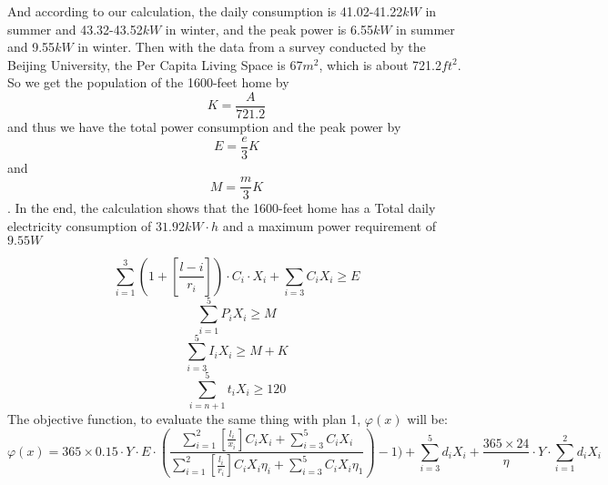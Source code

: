 \documentclass[12pt]{article}
\begin{document}
And according to our calculation, the daily consumption is 41.02-41.22$kW$ in summer and 43.32-43.52$kW$ in winter, and the peak power is 6.55$kW$ in summer and 9.55$kW$ in winter.
\newline
\newline
Then with the data from a survey conducted by the Beijing University, the Per Capita Living Space is 67$m^2$, which is about 721.2$ft^2$. So we get the population of the 1600-feet home
by $$K=\frac{A}{721.2}$$ and thus we have the total power consumption and the peak power by $$E=\frac{e}{3}K$$ and $$M=\frac{m}{3}K$$. In the end, the calculation shows that the 1600-feet home has a Total daily electricity consumption
of $31.92kW\cdot h$ and a maximum power requirement of $9.55W$


$$\sum_{i=1}^3(1+[\frac{l-i}{r_i}]) \cdot C_i \cdot X_i + \sum_{i=3}C_iX_i\geq E$$
$$\sum_{i=1}^5P_iX_i\geq M$$
$$\sum_{i=3}^5I_iX_i\geq M+K$$
$$\sum_{i=n+1}^5 t_iX_i\geq 120$$
The objective function, to evaluate the same thing with plan 1, $\varphi (x)$ will be:
$$\varphi (x) = 365 \times 0.15 \cdot Y \cdot E \cdot (\frac{\sum^2_{i=1}[\frac{l_i}{x_i}]C_iX_i+\sum_{i=3}^5C_iX_i}{\sum^2_{i=1}[\frac{l_i}{r_i}]C_iX_i\eta _i+\sum_{i=3}^5C_iX_i\eta _1})-1)
    + \sum_{i=3} ^5d_iX_i+\frac{365 \times 24}{\eta } \cdot Y \cdot \sum_{i=1} ^2d_iX_i $$
\end{document}
